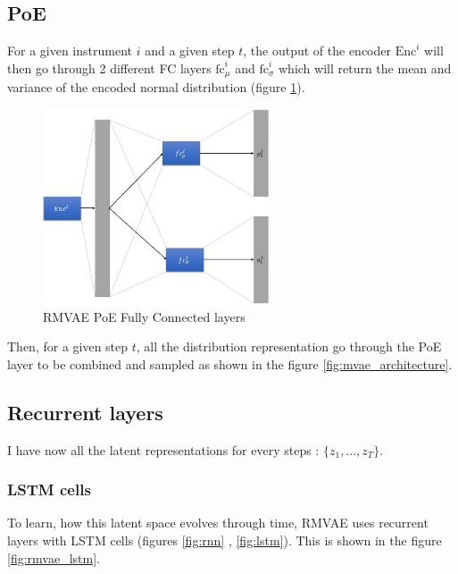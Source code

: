 \documentclass[12pt]{report}
\begin{document}
\subsection{PoE}

For a given instrument $i$ and a given step $t$, the output of the encoder $\text{Enc}^i$ will then go through 2 different FC layers $\text{fc}^i_\mu$ and $\text{fc}^i_\sigma$ which will return the mean and variance of the encoded normal distribution (figure \ref{fig:rmvae_poe_fc}).

\begin{figure}[h]
    \centering
    \includegraphics[width=0.6\textwidth]{images/nn/architectures/rmvae/poe_fc.jpg}
    \caption{RMVAE PoE Fully Connected layers}
    \label{fig:rmvae_poe_fc}
\end{figure}

Then, for a given step $t$, all the distribution representation go through the PoE layer to be combined and sampled as shown in the figure \ref{fig:mvae_architecture}.

\subsection{Recurrent layers}

I have now all the latent representations for every steps : $\{z_1, ..., z_T\}$.

\subsubsection{LSTM cells}

To learn, how this latent space evolves through time, RMVAE uses recurrent layers with LSTM cells (figures \ref{fig:rnn} , \ref{fig:lstm}).
This is shown in the figure \ref{fig:rmvae_lstm}.
\end{document}
